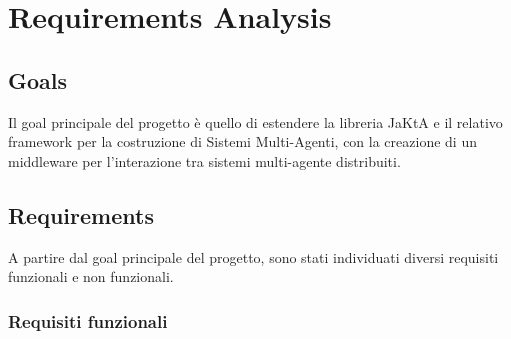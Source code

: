 \section{Requirements Analysis}

%
%

%

\subsection{Goals}

Il goal principale del progetto è quello di estendere la libreria JaKtA e il relativo framework per la costruzione di Sistemi Multi-Agenti,
con la creazione di un middleware per l'interazione tra sistemi multi-agente distribuiti.

\subsection{Requirements}
A partire dal goal principale del progetto, sono stati individuati diversi requisiti funzionali e non funzionali.

\subsubsection{Requisiti funzionali}

